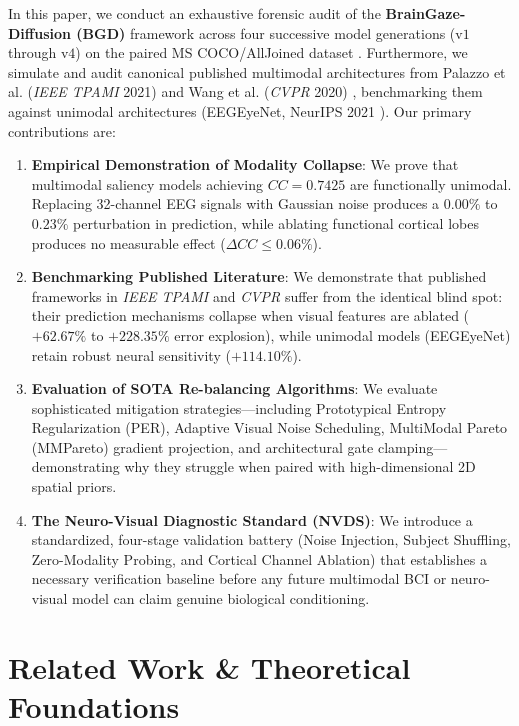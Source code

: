\documentclass[journal,twocolumn]{IEEEtran}
\begin{document}
In this paper, we conduct an exhaustive forensic audit of the \textbf{BrainGaze-Diffusion (BGD)} framework across four successive model generations ($\text{v1}$ through $\text{v4}$) on the paired MS COCO/AllJoined dataset \cite{gifford2022alljoined}. Furthermore, we simulate and audit canonical published multimodal architectures from Palazzo et al. (\textit{IEEE TPAMI} 2021) \cite{palazzo2020decoding} and Wang et al. (\textit{CVPR} 2020) \cite{wang2020makes}, benchmarking them against unimodal architectures (EEGEyeNet, NeurIPS 2021 \cite{kastrati2021eegeyenet}). Our primary contributions are:
\begin{enumerate}
    \item \textbf{Empirical Demonstration of Modality Collapse}: We prove that multimodal saliency models achieving $CC = 0.7425$ are functionally unimodal. Replacing 32-channel EEG signals with Gaussian noise produces a $0.00\%$ to $0.23\%$ perturbation in prediction, while ablating functional cortical lobes produces no measurable effect ($\Delta CC \le 0.06\%$).
    \item \textbf{Benchmarking Published Literature}: We demonstrate that published frameworks in \textit{IEEE TPAMI} and \textit{CVPR} suffer from the identical blind spot: their prediction mechanisms collapse when visual features are ablated ($+62.67\%$ to $+228.35\%$ error explosion), while unimodal models (EEGEyeNet) retain robust neural sensitivity ($+114.10\%$).
    \item \textbf{Evaluation of SOTA Re-balancing Algorithms}: We evaluate sophisticated mitigation strategies---including Prototypical Entropy Regularization (PER), Adaptive Visual Noise Scheduling, MultiModal Pareto (MMPareto) gradient projection, and architectural gate clamping---demonstrating why they struggle when paired with high-dimensional 2D spatial priors.
    \item \textbf{The Neuro-Visual Diagnostic Standard (NVDS)}: We introduce a standardized, four-stage validation battery (Noise Injection, Subject Shuffling, Zero-Modality Probing, and Cortical Channel Ablation) that establishes a necessary verification baseline before any future multimodal BCI or neuro-visual model can claim genuine biological conditioning.
\end{enumerate}

\section{Related Work \& Theoretical Foundations}
\end{document}
